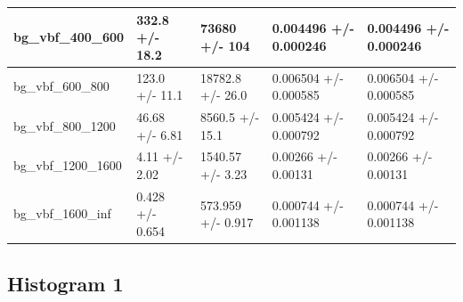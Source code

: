 \documentclass[a4paper, 10pt]{article}
\begin{document}
\begin{table}[H]
\begin{center}
\begin{tabular}{|m{20.0mm}|m{27.0mm}|m{27.0mm}|m{33.0mm}|m{32.0mm}|}
      \hline
      {\cellcolor{white}         bg\_vbf\_400\_600}& {\cellcolor{white}         332.8 +/\-- 18.2}& {\cellcolor{white}         73680 +/\-- 104}& {\cellcolor{white}         0.004496 +/\-- 0.000246}& {\cellcolor{white}         0.004496 +/\-- 0.000246}\\
      \hline
      {\cellcolor{white}         bg\_vbf\_600\_800}& {\cellcolor{white}         123.0 +/\-- 11.1}& {\cellcolor{white}         18782.8 +/\-- 26.0}& {\cellcolor{white}         0.006504 +/\-- 0.000585}& {\cellcolor{white}         0.006504 +/\-- 0.000585}\\
      \hline
      {\cellcolor{white}         bg\_vbf\_800\_1200}& {\cellcolor{white}         46.68 +/\-- 6.81}& {\cellcolor{white}         8560.5 +/\-- 15.1}& {\cellcolor{white}         0.005424 +/\-- 0.000792}& {\cellcolor{white}         0.005424 +/\-- 0.000792}\\
      \hline
      {\cellcolor{white}         bg\_vbf\_1200\_1600}& {\cellcolor{white}         4.11 +/\-- 2.02}& {\cellcolor{white}         1540.57 +/\-- 3.23}& {\cellcolor{white}         0.00266 +/\-- 0.00131}& {\cellcolor{white}         0.00266 +/\-- 0.00131}\\
      \hline
      {\cellcolor{white}         bg\_vbf\_1600\_inf}& {\cellcolor{white}         0.428 +/\-- 0.654}& {\cellcolor{white}         573.959 +/\-- 0.917}& {\cellcolor{white}         0.000744 +/\-- 0.001138}& {\cellcolor{white}         0.000744 +/\-- 0.001138}\\
\hline
    \end{tabular}
  \end{center}
\end{table}

   \newpage
\subsection{ Histogram 1}
\end{document}
